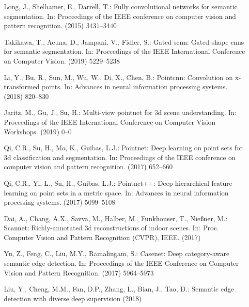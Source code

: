 \documentclass[runningheads]{llncs}
\begin{document}

\begin{thebibliography}{10}

Long, J., Shelhamer, E., Darrell, T.:
\newblock Fully convolutional networks for semantic segmentation.
\newblock In: Proceedings of the IEEE conference on computer vision and pattern
  recognition. (2015)  3431--3440

Takikawa, T., Acuna, D., Jampani, V., Fidler, S.:
\newblock Gated-scnn: Gated shape cnns for semantic segmentation.
\newblock In: Proceedings of the IEEE International Conference on Computer
  Vision. (2019)  5229--5238

Li, Y., Bu, R., Sun, M., Wu, W., Di, X., Chen, B.:
\newblock Pointcnn: Convolution on x-transformed points.
\newblock In: Advances in neural information processing systems. (2018)
  820--830

Jaritz, M., Gu, J., Su, H.:
\newblock Multi-view pointnet for 3d scene understanding.
\newblock In: Proceedings of the IEEE International Conference on Computer
  Vision Workshops. (2019)  0--0

Qi, C.R., Su, H., Mo, K., Guibas, L.J.:
\newblock Pointnet: Deep learning on point sets for 3d classification and
  segmentation.
\newblock In: Proceedings of the IEEE conference on computer vision and pattern
  recognition. (2017)  652--660

Qi, C.R., Yi, L., Su, H., Guibas, L.J.:
\newblock Pointnet++: Deep hierarchical feature learning on point sets in a
  metric space.
\newblock In: Advances in neural information processing systems. (2017)
  5099--5108

Dai, A., Chang, A.X., Savva, M., Halber, M., Funkhouser, T., Nie{\ss}ner, M.:
\newblock Scannet: Richly-annotated 3d reconstructions of indoor scenes.
\newblock In: Proc. Computer Vision and Pattern Recognition (CVPR), IEEE.
  (2017)

Yu, Z., Feng, C., Liu, M.Y., Ramalingam, S.:
\newblock Casenet: Deep category-aware semantic edge detection.
\newblock In: Proceedings of the IEEE Conference on Computer Vision and Pattern
  Recognition. (2017)  5964--5973

Liu, Y., Cheng, M.M., Fan, D.P., Zhang, L., Bian, J., Tao, D.:
\newblock Semantic edge detection with diverse deep supervision (2018)


\end{thebibliography}
\end{document}
